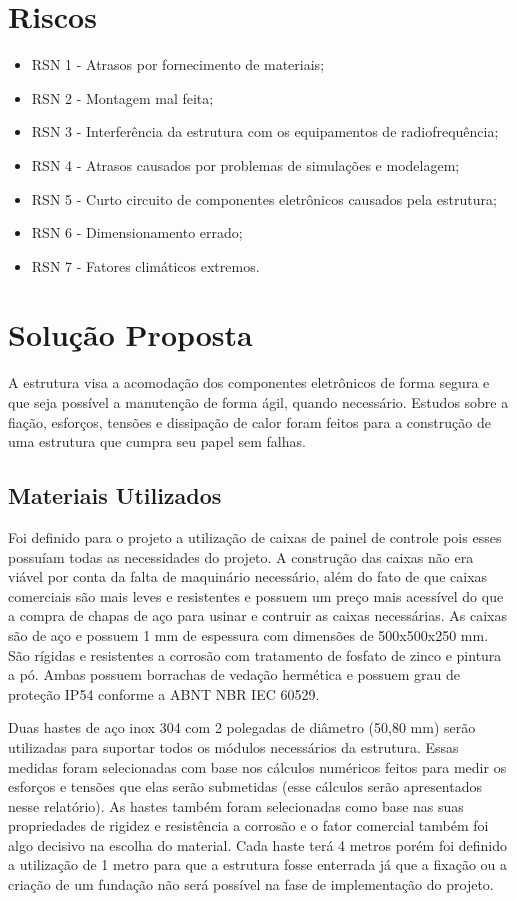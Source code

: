 \chapter{Riscos}

\begin{itemize}
\item RSN 1 - Atrasos por fornecimento de materiais;
\item RSN 2 - Montagem mal feita;
\item RSN 3 - Interferência da estrutura com os equipamentos de radiofrequência;
\item RSN 4 - Atrasos causados por problemas de simulações e modelagem;
\item RSN 5 - Curto circuito de componentes eletrônicos causados pela estrutura;
\item RSN 6 - Dimensionamento errado;
\item RSN 7 - Fatores climáticos extremos.
\end{itemize}

\chapter{Solução Proposta}

A estrutura visa a acomodação dos componentes eletrônicos de forma segura e que seja possível a manutenção de forma ágil, quando necessário. Estudos sobre a fiação, esforços, tensões e dissipação de calor foram feitos para a construção de uma estrutura que cumpra seu papel sem falhas.

\section{Materiais Utilizados}

Foi definido para o projeto a utilização de caixas de painel de controle pois esses possuíam todas as necessidades do projeto. A construção das caixas não era viável por conta da falta de maquinário necessário, além do fato de que caixas comerciais são mais leves e resistentes e possuem um preço mais acessível do que a compra de chapas de aço para usinar e contruir as caixas necessárias. As caixas são de aço e possuem 1 mm de espessura com dimensões de 500x500x250 mm. São rígidas e resistentes a corrosão com tratamento de fosfato de zinco e pintura a pó. Ambas possuem borrachas de vedação hermética e possuem grau de proteção IP54 conforme a ABNT NBR IEC 60529. 

Duas hastes de aço inox 304 com 2 polegadas de diâmetro (50,80 mm) serão utilizadas para suportar todos os módulos necessários da estrutura. Essas medidas foram selecionadas com base nos cálculos numéricos feitos para medir os esforços e tensões que elas serão submetidas (esse cálculos serão apresentados nesse relatório). As hastes também foram selecionadas como base nas suas propriedades de rigidez e resistência a corrosão e o fator comercial também foi algo decisivo na escolha do material. Cada haste terá 4 metros porém foi definido a utilização de 1 metro para que a estrutura fosse enterrada já que a fixação ou a criação de um fundação não será possível na fase de implementação do projeto. 

